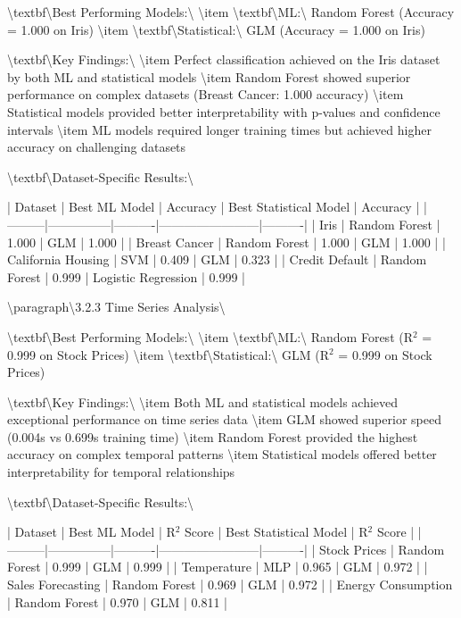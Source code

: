 \documentclass[11pt,a4paper]{article}
\begin{document}
\textbackslash{}textbf\textbackslash{}{Best Performing Models:\textbackslash{}}
\textbackslash{}item \textbackslash{}textbf\textbackslash{}{ML:\textbackslash{}} Random Forest (Accuracy = 1.000 on Iris)
\textbackslash{}item \textbackslash{}textbf\textbackslash{}{Statistical:\textbackslash{}} GLM (Accuracy = 1.000 on Iris)

\textbackslash{}textbf\textbackslash{}{Key Findings:\textbackslash{}}
\textbackslash{}item Perfect classification achieved on the Iris dataset by both ML and statistical models
\textbackslash{}item Random Forest showed superior performance on complex datasets (Breast Cancer: 1.000 accuracy)
\textbackslash{}item Statistical models provided better interpretability with p-values and confidence intervals
\textbackslash{}item ML models required longer training times but achieved higher accuracy on challenging datasets

\textbackslash{}textbf\textbackslash{}{Dataset-Specific Results:\textbackslash{}}

| Dataset | Best ML Model | Accuracy | Best Statistical Model | Accuracy |
|---------|---------------|----------|------------------------|----------|
| Iris | Random Forest | 1.000 | GLM | 1.000 |
| Breast Cancer | Random Forest | 1.000 | GLM | 1.000 |
| California Housing | SVM | 0.409 | GLM | 0.323 |
| Credit Default | Random Forest | 0.999 | Logistic Regression | 0.999 |

\textbackslash{}paragraph\textbackslash{}{3.2.3 Time Series Analysis\textbackslash{}}

\textbackslash{}textbf\textbackslash{}{Best Performing Models:\textbackslash{}}
\textbackslash{}item \textbackslash{}textbf\textbackslash{}{ML:\textbackslash{}} Random Forest (R$^2$ = 0.999 on Stock Prices)
\textbackslash{}item \textbackslash{}textbf\textbackslash{}{Statistical:\textbackslash{}} GLM (R$^2$ = 0.999 on Stock Prices)

\textbackslash{}textbf\textbackslash{}{Key Findings:\textbackslash{}}
\textbackslash{}item Both ML and statistical models achieved exceptional performance on time series data
\textbackslash{}item GLM showed superior speed (0.004s vs 0.699s training time)
\textbackslash{}item Random Forest provided the highest accuracy on complex temporal patterns
\textbackslash{}item Statistical models offered better interpretability for temporal relationships

\textbackslash{}textbf\textbackslash{}{Dataset-Specific Results:\textbackslash{}}

| Dataset | Best ML Model | R$^2$ Score | Best Statistical Model | R$^2$ Score |
|---------|---------------|----------|------------------------|----------|
| Stock Prices | Random Forest | 0.999 | GLM | 0.999 |
| Temperature | MLP | 0.965 | GLM | 0.972 |
| Sales Forecasting | Random Forest | 0.969 | GLM | 0.972 |
| Energy Consumption | Random Forest | 0.970 | GLM | 0.811 |
\end{document}
